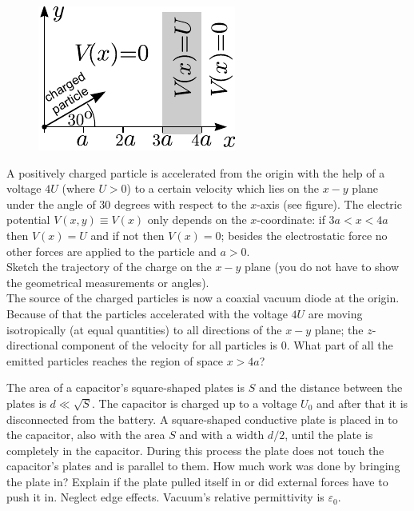 \documentclass[11pt]{article}
\begin{document}
\probeng
\begin{figure}%
\vspace{-10pt}
\includegraphics[width=\linewidth]{2012-v3g-09-laeng_ing}%
\end{figure}
A positively charged particle is accelerated from the origin with the help of a voltage $4U$ (where $U>0$) to a certain velocity which lies on the $x-y$ plane under the angle of $30$ degrees with respect to the $x$-axis (see figure). The electric potential $V(x,y)\equiv V(x)$ only depends on the $x$-coordinate: if $3a<x<4a$ then $V(x)=U$ and if not then $V(x)=0$; besides the electrostatic force no other forces are applied to the particle and $a>0$.\\
\osa Sketch the trajectory of the charge on the $x-y$ plane (you do not have to show the geometrical measurements or angles).\\
\osa The source of the charged particles is now a coaxial vacuum diode at the origin. Because of that the particles accelerated with the voltage $4U$ are moving isotropically (at equal quantities) to all directions of the $x-y$ plane; the $z$-directional component of the velocity for all particles is 0. What part of all the emitted particles reaches the region of space $x>4a$?
\probend
\bigskip


\probeng
The area of a capacitor’s square-shaped plates is $S$ and the distance between the plates is $d \ll \sqrt{S}$. The capacitor is charged up to a voltage $U_0$ and after that it is disconnected from the battery. A square-shaped conductive plate is placed in to the capacitor, also with the area $S$ and with a width $d/2$, until the plate is completely in the capacitor. During this process the plate does not touch the capacitor’s plates and is parallel to them. How much work was done by bringing the plate in? Explain if the plate pulled itself in or did external forces have to push it in. Neglect edge effects. Vacuum’s relative permittivity is $\varepsilon_0$.
\probend
\bigskip
\end{document}
